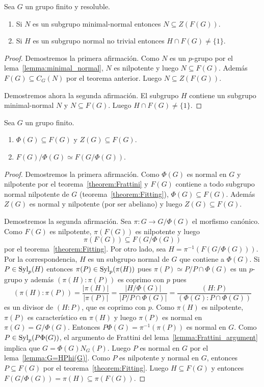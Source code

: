 \begin{corollary}
	Sea $G$ un grupo finito y resoluble. 
	\begin{enumerate}
		\item Si $N$ es un subgrupo minimal-normal entonces $N\subseteq
			Z(F(G))$. 
		\item Si $H$ es un subgrupo normal no trivial entonces $H\cap F(G)\ne\{1\}$.
	\end{enumerate}
\end{corollary}

\begin{proof}
	Demostremos la primera afirmación. Como $N$ es un $p$-grupo por el
	lema~\ref{lemma:minimal_normal}, $N$ es nilpotente y luego $N\subseteq
	F(G)$. 	Además $F(G)\subseteq C_G(N)$ por el
	teorema anterior.  Luego $N\subseteq Z(F(G))$. 

	Demostremos ahora la segunda afirmación. El subgrupo $H$ contiene un
	subgrupo minimal-normal $N$ y $N\subseteq F(G)$. Luego $H\cap F(G)\ne\{1\}$. 
\end{proof}

\begin{theorem}
	Sea $G$ un grupo finito.
	\begin{enumerate}
		\item $\Phi(G)\subseteq F(G)$ y $Z(G)\subseteq F(G)$.
		\item $F(G)/\Phi(G)\simeq F(G/\Phi(G))$.
	\end{enumerate}
\end{theorem}

\begin{proof}
	Demostremos la primera afirmación. Como $\Phi(G)$ es normal en $G$ y
	nilpotente por el teorema~\ref{theorem:Frattini} y $F(G)$ contiene a todo
	subgrupo normal nilpotente de $G$ (teorema~\ref{theorem:Fitting}),
	$\Phi(G)\subseteq F(G)$. Además $Z(G)$ es normal y nilpotente (por ser
	abeliano) y luego $Z(G)\subseteq F(G)$.

	Demostremos la segunda afirmación. Sea $\pi\colon G\to G/\Phi(G)$ el
	morfismo canónico. Como $F(G)$ es nilpotente, $\pi(F(G))$ es nilpotente y
	luego 
	\[
	\pi(F(G))\subseteq F(G/\Phi(G))
	\]
	por el teorema~\ref{theorem:Fitting}. Por otro lado, sea
	$H=\pi^{-1}(F(G/\Phi(G)))$. Por la correspondencia, $H$ es un subgrupo
	normal de $G$ que contiene a $\Phi(G)$. Si $P\in\mathrm{Syl}_p(H)$ entonces
	$\pi(P)\in\mathrm{Syl}_p(\pi(H))$ pues $\pi(P)\simeq P/P\cap \Phi(G)$ es un
	$p$-grupo y además $(\pi(H):\pi(P))$ es coprimo con $p$ pues 
	\[
	(\pi(H):\pi(P))
	=\frac{|\pi(H)|}{|\pi(P)|}
	=\frac{|H/\Phi(G)|}{|P/P\cap \Phi(G)|}
	=\frac{(H:P)}{(\Phi(G):P\cap\Phi(G))}
	\]
	es un divisor de $(H:P)$, que es coprimo con $p$. Como $\pi(H)$ es
	nilpotente, $\pi(P)$ es característico en $\pi(H)$ y luego $\pi(P)$ es
	normal en $\pi(G)=G/\Phi(G)$. Entonces $P\Phi(G)=\pi^{-1}(\pi(P))$ es
	normal en $G$. Como $P\in\mathrm{Syl}_p(P\Phi(G))$, el argumento de Frattini del
	lema~\ref{lemma:Frattini_argument} implica que $G=\Phi(G)N_G(P)$. Luego $P$
	es normal en $G$ por el lema~\ref{lemma:G=HPhi(G)}. Como $P$ es nilpotente
	y normal en $G$, entonces $P\subseteq F(G)$ por el
	teorema~\ref{theorem:Fitting}. Luego $H\subseteq F(G)$ y entonces
	$F(G/\Phi(G))=\pi(H)\subseteq \pi(F(G))$.
\end{proof}

